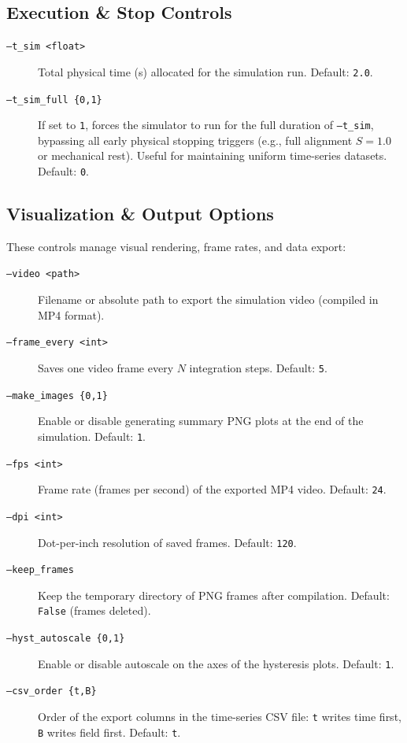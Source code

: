 \documentclass[11pt,a4paper]{article}
\newcommand{\code}[1]{\texttt{#1}}
\begin{document}
\subsection{Execution \& Stop Controls}
\begin{description}
    \item[\code{--t\_sim <float>}] Total physical time (\si{s}) allocated for the simulation run. Default: \code{2.0}.
    \item[\code{--t\_sim\_full \{0,1\}}] If set to \code{1}, forces the simulator to run for the full duration of \code{--t\_sim}, bypassing all early physical stopping triggers (e.g., full alignment $S=1.0$ or mechanical rest). Useful for maintaining uniform time-series datasets. Default: \code{0}.
\end{description}

\subsection{Visualization \& Output Options}
These controls manage visual rendering, frame rates, and data export:
\begin{description}
    \item[\code{--video <path>}] Filename or absolute path to export the simulation video (compiled in MP4 format).
    \item[\code{--frame\_every <int>}] Saves one video frame every $N$ integration steps. Default: \code{5}.
    \item[\code{--make\_images \{0,1\}}] Enable or disable generating summary PNG plots at the end of the simulation. Default: \code{1}.
    \item[\code{--fps <int>}] Frame rate (frames per second) of the exported MP4 video. Default: \code{24}.
    \item[\code{--dpi <int>}] Dot-per-inch resolution of saved frames. Default: \code{120}.
    \item[\code{--keep\_frames}] Keep the temporary directory of PNG frames after compilation. Default: \code{False} (frames deleted).
    \item[\code{--hyst\_autoscale \{0,1\}}] Enable or disable autoscale on the axes of the hysteresis plots. Default: \code{1}.
    \item[\code{--csv\_order \{t,B\}}] Order of the export columns in the time-series CSV file: \code{t} writes time first, \code{B} writes field first. Default: \code{t}.
\end{description}
\end{document}
